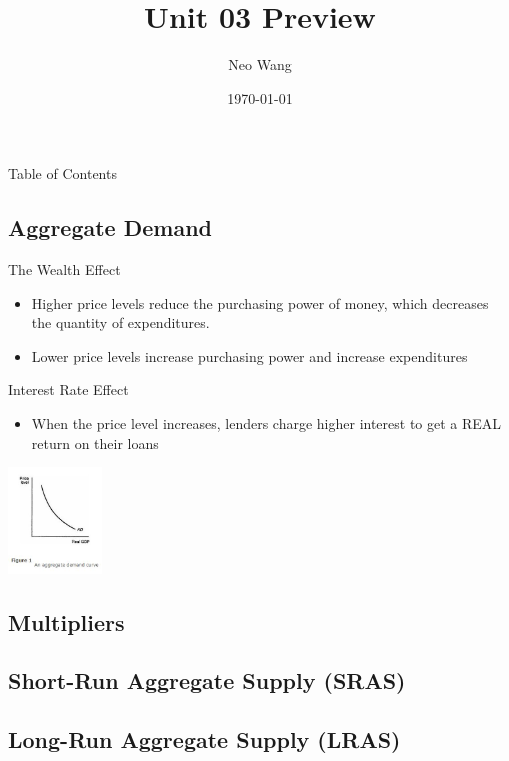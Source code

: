 \documentclass[8pt]{beamer}
\title{Unit 03 Preview}
\date{\today}
\author{Neo Wang}
\institute{Westlake High School}
\begin{document}
  \maketitle
  \begin{frame}{Table of Contents}
	\tableofcontents
  \end{frame}
  \begin{frame}
	\section{Aggregate Demand}
	The Wealth Effect
	\begin{itemize}
		\item \tiny Higher price levels reduce the purchasing power of money, which
		decreases the quantity of expenditures.
		\item \tiny Lower price levels increase purchasing power and increase
		expenditures
	\end{itemize}
	Interest Rate Effect
	\begin{itemize}
		\item \tiny When the price level increases, lenders charge higher interest to
		get a REAL return on their loans
	\end{itemize}
	\includegraphics[width=2.5cm]{2021-10-12-11-50-24.png}
  \end{frame}
  \begin{frame}
	\section{Multipliers}
  \end{frame}
  \begin{frame}
	\section{Short-Run Aggregate Supply (SRAS)}
  \end{frame}
  \begin{frame}
	\section{Long-Run Aggregate Supply (LRAS)}
  \end{frame}
\end{document}
